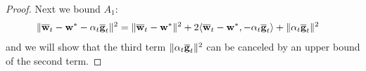 \begin{proof}
	Next we bound $A_{1}$: 
	\begin{align*}
	\|{\overline{\mathbf{w}}}_{t}-{\mathbf{w}}^{\ast}-\alpha_{t}{\overline{\mathbf{g}}}_{t}\|^{2} & =\|{\overline{\mathbf{w}}}_{t}-{\mathbf{w}}^{\ast}\|^{2}+2\langle{\overline{\mathbf{w}}}_{t}-{\mathbf{w}}^{\ast},-\alpha_{t}{\overline{\mathbf{g}}}_{t}\rangle+\|\alpha_{t}{\overline{\mathbf{g}}}_{t}\|^{2}
	\end{align*}
	and we will show that the third term $\|\alpha_{t}{\overline{\mathbf{g}}}_{t}\|^{2}$
	can be canceled by an upper bound of the second term. %
	\begin{comment}
	The last term is straightforward to bound by the convexity of $\|\cdot\|^{2}$
	and $L$-smoothness of $F_{k}$,
	\begin{align*}
	\alpha_{t}^{2}\|\ov{g}_{t}\|^{2} & \leq\alpha_{t}^{2}\sum_{k=1}^{N}p_{k}\|\nabla F_{k}(\vw_{t}^{k})\|^{2}\leq2L\alpha_{t}^{2}\sum_{k=1}^{N}p_{k}(F_{k}(\vw_{t}^{k})-F_{k}^{\ast})
	\end{align*}
	or 
	\begin{align*}
	\alpha_{t}^{2}\|\ov{g}_{t}\|^{2} & \leq\alpha_{t}^{2}\sum_{k=1}^{N}p_{k}\|\nabla F_{k}(\vw_{t}^{k})\|^{2}\leq\alpha_{t}^{2}\sum_{k=1}^{N}p_{k}\mathbb{E}\|\nabla F_{k}(\vw_{t}^{k},\xi_{t}^{k})\|^{2}\leq\alpha_{t}^{2}G^{2}
	\end{align*}
	\end{comment}
	

\end{proof}
